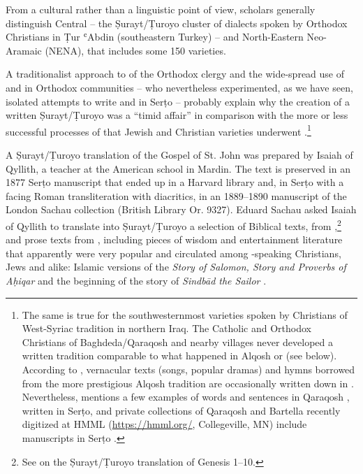 \documentclass[output=paper,colorlinks,citecolor=brown,arabfont,syriacfont]{langscibook}
\begin{document}
From a cultural rather than a linguistic point of view, scholars generally distinguish Central  -- the Ṣurayt/Ṭuroyo cluster of dialects spoken by  Orthodox Christians in Ṭur ʿAbdin (southeastern Turkey) -- and North-Eastern Neo-Aramaic (NENA), that includes some 150 varieties. 

A traditionalist approach to  of the  Orthodox clergy and the wide-spread use of  and  in  Orthodox communities -- who nevertheless experimented, as we have seen, isolated attempts to write  and  in Serṭo  -- probably explain why the creation of a written Ṣurayt/Ṭuroyo was a ``timid affair'' in comparison with the more or less successful processes of  that Jewish and Christian  varieties underwent \citep[185]{heinrichs1990}.\footnote{%
The same is true for the southwesternmost  varieties spoken by Christians of West-Syriac tradition in northern Iraq. The  Catholic and  Orthodox Christians of Baghdeda/Qaraqosh and nearby villages never developed a written tradition comparable to what happened in Alqosh or  (see below). According to \citet[8]{khan2002}, vernacular texts (songs, popular dramas) and hymns borrowed from the more prestigious Alqosh tradition are occasionally written down in  . Nevertheless, \citet[38--40]{sony1998} mentions a few examples of words and sentences in Qaraqosh , written in Serṭo, and private collections of Qaraqosh and Bartella recently digitized at HMML (\url{https://hmml.org/}, Collegeville, MN) include  manuscripts in Serṭo .}

A Ṣurayt/Ṭuroyo translation of the Gospel of St. John was prepared by Isaiah of Qyllith, a teacher at the American school in Mardin. The text is preserved in an 1877 Serṭo manuscript that ended up in a Harvard library and, in Serṭo with a facing Roman transliteration with diacritics, in an 1889--1890 manuscript of the London Sachau collection (British Library Or. 9327). Eduard Sachau asked Isaiah of Qyllith to translate into Ṣurayt/Ṭuroyo a selection of Biblical texts, from ,\footnote{%
See \citet{atas2017-2018} on the Ṣurayt/Ṭuroyo translation of Genesis 1--10.} and prose texts from , including pieces of wisdom and entertainment literature that apparently were very popular and circulated among -speaking Christians, Jews and  alike: Islamic versions of the \textit{Story of Salomon, Story and Proverbs of Aḥiqar} and the beginning of the story of \textit{Sindbād the Sailor} \citep[425]{bellino_mengozzi2016}.
\end{document}

